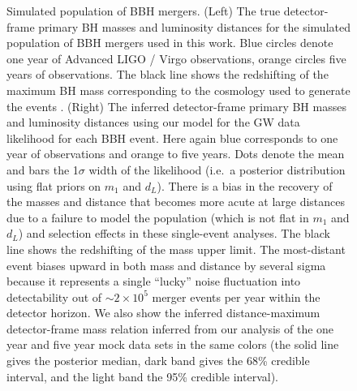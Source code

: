 \documentclass[modern]{aastex62}
\begin{document}
\begin{figure}
%
  \caption{\label{fig:m1-dL} Simulated population of \ac{BBH} mergers.  (Left)
  The true detector-frame primary \ac{BH} masses and luminosity distances for
  the simulated population of \ac{BBH} mergers used in this work.  Blue circles
  denote one year of Advanced LIGO / Virgo observations, orange circles five
  years of observations. The black line shows the redshifting of the maximum
  \ac{BH} mass corresponding to the cosmology used to generate the events
  \citep[TT, TE, EE + lowP + lensing + ext]{Planck2016}.  (Right) The inferred
  detector-frame primary \ac{BH} masses and luminosity distances using our model
  for the \ac{GW} data likelihood for each \ac{BBH} event.  Here again blue
  corresponds to one year of observations and orange to five years.  Dots denote
  the mean and bars the 1$\sigma$ width of the likelihood (i.e.\ a posterior
  distribution using flat priors on $m_1$ and $d_L$).  There is a bias in the
  recovery of the masses and distance that becomes more acute at large distances
  due to a failure to model the population (which is not flat in $m_1$ and
  $d_L$) and selection effects in these single-event analyses.  The black line
  shows the redshifting of the mass upper limit.  The most-distant event biases
  upward in both mass and distance by several sigma because it represents a
  single ``lucky'' noise fluctuation into detectability out of $\sim 2 \times
  10^5$ merger events per year within the detector horizon.  We also show the
  inferred distance-maximum detector-frame mass relation inferred from our
  analysis of the one year and five year mock data sets in the same colors (the
  solid line gives the posterior median, dark band gives the 68\% credible
  interval, and the light band the 95\% credible interval).}
%
\end{figure}
\end{document}

